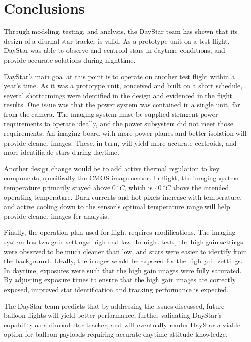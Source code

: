 \documentclass[twocolumn,letterpaper]{IEEEAerospace2012}
\begin{document}
\section{Conclusions}
Through modeling, testing, and analysis, the DayStar team has shown that its design of a diurnal star tracker is valid. As a prototype unit on a test flight, DayStar was able to observe and centroid stars in daytime conditions, and provide accurate solutions during nighttime.

DayStar's main goal at this point is to operate on another test flight within a year's time. As it was a prototype unit, conceived and built on a short schedule, several shortcomings were identified in the design and evidenced in the flight results. One issue was that the power system was contained in a single unit, far from the camera. The imaging system must be supplied stringent power requirements to operate ideally, and the power subsystem did not meet those requirements. An imaging board with more power planes and better isolation will provide cleaner images. These, in turn, will yield more accurate centroids, and more identifiable stars during daytime.

Another design change would be to add active thermal regulation to key components, specifically the CMOS image sensor. In flight, the imaging system temperature primarily stayed above $0 \ ^{\circ} C$, which is $40 \ ^{\circ} C$ above the intended operating temperature. Dark currents and hot pixels increase with temperature, and active cooling down to the sensor's optimal temperature range will help provide cleaner images for analysis.

Finally, the operation plan used for flight requires modifications. The imaging system has two gain settings: high and low. In night tests, the high gain settings were observed to be much cleaner than low, and stars were easier to identify from the background. Ideally, the images would be exposed for the high gain settings. In daytime, exposures were such that the high gain images were fully saturated. By adjusting exposure times to ensure that the high gain images are correctly exposed, improved star identification and tracking performance is expected.

The DayStar team predicts that by addressing the issues discussed, future balloon flights will yield better performance, further validating DayStar's capability as a diurnal star tracker, and will eventually render DayStar a viable option for balloon payloads requiring accurate daytime attitude knowledge.
\end{document}
